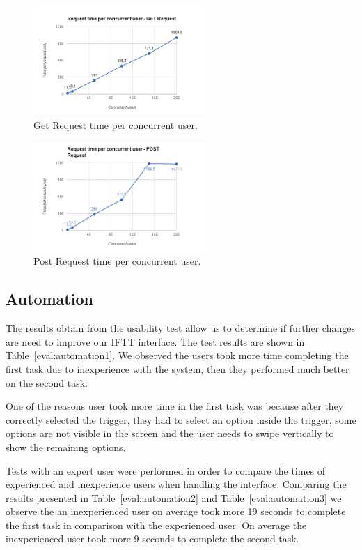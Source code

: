 \begin{figure}[H]
\centering
\includegraphics[width=0.6\textwidth]{Figures/bench_get}
\caption{Get Request time per concurrent user.}
\label{eval:server1}
\end{figure}

\begin{figure}[H]
\centering
\includegraphics[width=0.6\textwidth]{Figures/bench_post}
\caption{Post Request time per concurrent user.}
\label{eval:server1}
\end{figure}





\subsection{Automation}

The results obtain from the usability test allow us to determine if further changes are need to improve our \ac{IFTT} interface. The test results are shown in  Table~\ref{eval:automation1}. We observed the users took more time completing the first task due to inexperience with the system, then they performed much better on the second task. 

One of the reasons user took more time in the first task was because after they correctly selected the trigger, they had to select an option inside the trigger, some options are not visible in the screen and the user needs to swipe vertically to show the remaining options.

Tests with an expert user were performed in order to compare the times of experienced and inexperience users when handling the interface. Comparing the results presented in Table~\ref{eval:automation2} and Table~\ref{eval:automation3} we observe the an inexperienced user on average took more 19 seconds to complete the first task in comparison with the experienced user. On average the inexperienced user took more 9 seconds to complete the second task.


